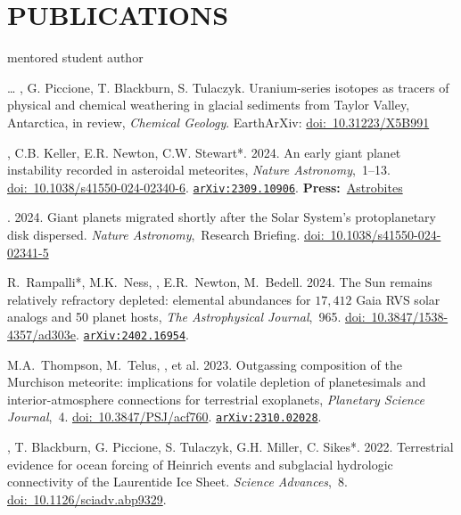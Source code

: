 \section*{PUBLICATIONS}
\hfill* mentored student author
\newcommand{\inprep}[1]{in prep, \textit{#1}}
\newcommand{\submitted}[1]{submitted, \textit{#1}}
\newcommand{\inreview}[1]{in review, \textit{#1}}
\newcommand{\inpress}[1]{in press, \textit{#1}}
\newcommand{\doi}[1]{\href{https://doi.org/#1}{doi:~#1}}
\newcommand{\arxiv}[1]{\href{https://arxiv.org/abs/#1}{\texttt{arXiv:#1}}}
\newcommand{\press}[2]{\textbf{Press:}~\href{#1}{#2}}
\newcommand{\pub}[2]{\textit{#1},~#2}

\begin{etaremune} [itemsep=4pt, leftmargin=3ex]
    \item[\dots] \ghedwards, G. Piccione, T. Blackburn,  S. Tulaczyk. Uranium-series isotopes as tracers of physical and chemical weathering in glacial sediments from Taylor Valley, Antarctica, \inreview{Chemical Geology}. EarthArXiv: \doi{10.31223/X5B991}
    \item \ghedwards, C.B. Keller, E.R. Newton, C.W. Stewart*. 2024. An early giant planet instability recorded in asteroidal meteorites, \pub{Nature Astronomy}{1--13}. \doi{10.1038/s41550-024-02340-6}. \arxiv{2309.10906}. \press{https://astrobites.org/2023/09/25/meteorites-planet-migration/}{Astrobites}
    \item \ghedwards. 2024. Giant planets migrated shortly after the Solar System’s protoplanetary disk dispersed. \pub{Nature Astronomy} Research Briefing. \doi{10.1038/s41550-024-02341-5}
    \item R.~Rampalli*, M.K.~Ness, \ghedwards, E.R.~Newton, M.~Bedell. 2024. The Sun remains relatively refractory depleted: elemental abundances for $17,412$ Gaia RVS solar analogs and 50 planet hosts, \pub{The Astrophysical Journal}{965}. \doi{10.3847/1538-4357/ad303e}. \arxiv{2402.16954}.
    \item M.A.~Thompson, M.~Telus, \ghedwards, et al. 2023. Outgassing composition of the Murchison meteorite: implications for volatile depletion of planetesimals and interior-atmosphere connections for terrestrial exoplanets, \pub{Planetary Science Journal}{4}. \doi{10.3847/PSJ/acf760}. \arxiv{2310.02028}.
    \item \ghedwards, T. Blackburn, G. Piccione, S. Tulaczyk, G.H. Miller, C. Sikes*. 2022. Terrestrial evidence for ocean forcing of Heinrich events and subglacial hydrologic connectivity of the Laurentide Ice Sheet. \pub{Science Advances}{8}. \doi{10.1126/sciadv.abp9329}.

\end{etaremune}
